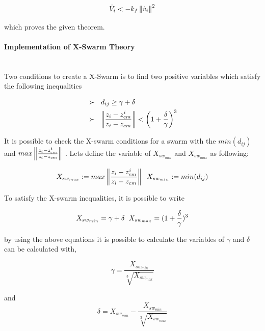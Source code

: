 \begin{equation}
\dot{V}_i < -k_f \left\lVert\dot{v}_i\right\rVert ^2
\end{equation}

which proves the given theorem.  \newline

\paragraph{Implementation of X-Swarm Theory}\hspace{0pt} \\		
Two conditions to create a X-Swarm is to find two positive variables which satisfy the following inequalities

\begin{align*}
&\succ\hspace{0.2cm}  d_{ij} \geq \gamma + \delta \\
&\succ \hspace{0.2cm}   \left\lVert\frac{z_i - z_{cm}^i}{z_i - z_{cm}}\right\rVert < \left(1+\frac{\delta}{\gamma}\right)^3
\end{align*}
		
It is possible to check the X-swarm conditions for a swarm  with the $min(d_{ij})$ and $max \left\lVert\frac{z_i - z_{cm}^i}{z_i - z_{cm}}\right\rVert $ . Lets define the variable  of $X_{sw_{min}}$ and $X_{sw_{max}}$ as following:

\begin{equation}
X_{sw_{max}} := max \left\lVert\frac{z_i - z_{cm}^i}{z_i - z_{cm}}\right\rVert  \hspace{0.2cm} X_{sw_{min}} := min(d_{ij})
\end{equation}

To satisfy the X-swarm inequalities, it is possible to write 

\begin{equation}
 X_{sw_{min}} = \gamma + \delta  \hspace{0.2cm} X_{sw_{max}} = (1 + \frac{\delta}{\gamma})^3
\end{equation}

by using the above equations it is possible to calculate the variables of $\gamma$ and $\delta$ can be calculated with,

\begin{equation}
\gamma = \frac{ X_{sw_{min}}}{\sqrt[3]{ X_{sw_{max}}}}
\end{equation}
			
and
\begin{equation}
\delta =  X_{sw_{min}} - \frac{ X_{sw_{min}}}{\sqrt[3]{ X_{sw_{max}}}}
\end{equation}

